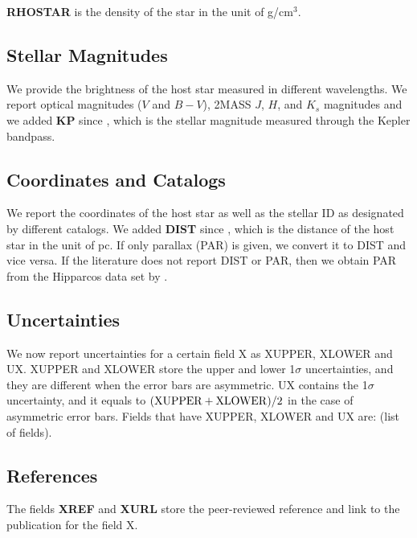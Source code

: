 \documentclass[11pt,preprint]{aastex}
\begin{document}
\begin{CJK*}{UTF8}{gbsn}
{\bf RHOSTAR} is the density of the star in the unit of g/cm$^3$.

\subsection {Stellar Magnitudes}

We provide the brightness of the host star measured in different
wavelengths. We report optical magnitudes ($V$ and $B-V$), 2MASS $J$,
$H$, and $K_s$ magnitudes and we added {\bf KP} since
\cite{Wright2011}, which is the stellar magnitude measured through the
Kepler bandpass.

\subsection{Coordinates and Catalogs}
We report the coordinates of the host star as well as the stellar ID
as designated by different catalogs.  We added {\bf DIST} since
\cite{Wright2011}, which is the distance of the host star in the unit
of pc. If only parallax (PAR) is given, we convert it to DIST and vice
versa. If the literature does not report DIST or PAR, then we obtain
PAR from the Hipparcos data set by \cite{van Leeuwen2009}.

\subsection{Uncertainties}

We now report uncertainties for a certain field X as XUPPER, XLOWER
and UX. XUPPER and XLOWER store the upper and lower 1$\sigma$
uncertainties, and they are different when the error bars are
asymmetric. UX contains the 1$\sigma$ uncertainty, and it
equals to $({\rm XUPPER+XLOWER})/2$ in the case of asymmetric error
bars. Fields that have XUPPER, XLOWER and UX are: (list of fields).

\subsection{References}

The fields {\bf XREF} and {\bf XURL} store the peer-reviewed reference and link to
the publication for the field X. 


\end{CJK*}
\end{document}
